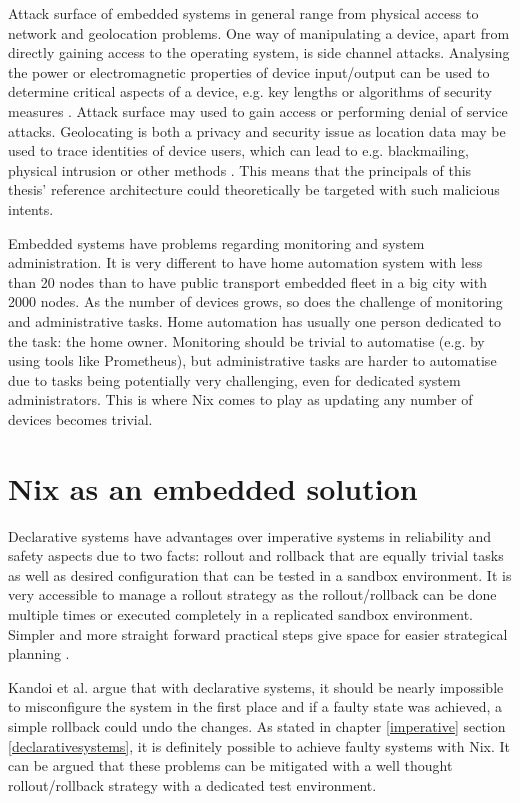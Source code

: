 Attack surface of embedded systems in general range from physical
access to network and geolocation problems. One way of manipulating a
device, apart from directly gaining access to the operating system,
is side channel attacks. Analysing the power or electromagnetic
properties of device input/output can be used to determine critical
aspects of a device, e.g. key lengths or algorithms of security
measures \cite{fysarakis2014embedded, serpanos2013security}. Attack
surface may used to gain access or performing denial of service
attacks. Geolocating is both a privacy and security issue as location
data may be used to trace identities of device users, which can lead
to e.g. blackmailing, physical intrusion or other methods 
\cite{fysarakis2014embedded}. This means that the principals of this
thesis' reference architecture could theoretically be targeted with such malicious
intents.

Embedded systems have problems regarding monitoring and system
administration. It is very different to have home automation system
with less than 20 nodes than to have public transport embedded fleet
in a big city with 2000 nodes. As the number of devices grows, so does
the challenge of monitoring and administrative tasks. Home automation
has usually one person dedicated to the task: the home owner. Monitoring should be trivial to automatise (e.g. by using
tools like Prometheus), but administrative tasks are harder to
automatise due to tasks being potentially very challenging, even for
dedicated system administrators. This is where Nix comes to play as
updating any number of devices becomes trivial.


\section{Nix as an embedded solution} \label{nixosassolution}

Declarative systems have advantages over imperative systems in
reliability and safety aspects due to two facts: rollout and rollback
that are equally trivial tasks as well as desired configuration that can be tested in a
sandbox environment. It is very accessible to manage a rollout strategy
as the rollout/rollback can be done multiple times or executed
completely in a replicated sandbox environment. Simpler and more straight forward practical steps give space for
easier strategical planning \cite{kandoi2021operating}.

Kandoi et al. \cite{kandoi2021operating} argue that with declarative systems, it should be nearly
impossible to misconfigure the system in the first place and if a faulty
state was achieved, a simple rollback could undo the changes. As stated in chapter \ref{imperative}
section \ref{declarativesystems}, it is definitely possible to achieve
faulty systems with Nix. It can be argued that these problems can be mitigated
with a well thought rollout/rollback strategy with a dedicated test environment.

